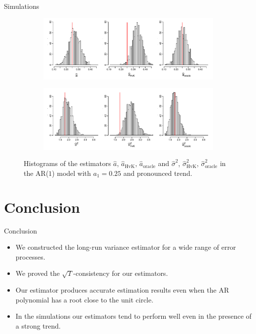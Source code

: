 \documentclass[10pt, handout]{beamer}
\begin{document}
\begin{frame}{Simulations}


\begin{figure}[t!]
\centering
\begin{subfigure}[b]{0.8\textwidth}
\includegraphics[width=\textwidth]{a_hat_histograms_a1=25_T=500_slope=10_(q,r,M1,M2)=(25,10,20,30).pdf}
\end{subfigure}
\begin{subfigure}[b]{0.8\textwidth}
\includegraphics[width=\textwidth]{lrv_histograms_a1=25_T=500_slope=10_(q,r,M1,M2)=(25,10,20,30).pdf}
\end{subfigure}
\caption{Histograms of the estimators $\widehat{a}$, $\widehat{a}_{\text{HvK}}$, $\widehat{a}_{\text{oracle}}$ and $\widehat{\sigma}^2$, $\widehat{\sigma}^2_{\text{HvK}}$, $\widehat{\sigma}^2_{\text{oracle}}$ in the AR($1$) model with $a_1 = 0.25$ and pronounced trend.}\label{fig:hist_scenario2} 
\end{figure}

\end{frame}


\section{Conclusion}
\begin{frame}{Conclusion}
\begin{itemize}
\item We constructed the long-run variance estimator for a wide range of error processes.
\item We proved the $\sqrt{T}$-consistency for our estimators.
\item Our estimator produces accurate estimation results even when the AR polynomial has a root close to the unit circle.
\item In the simulations our estimators tend to perform well even in the presence of a strong trend.
\end{itemize}
\end{frame}
\end{document}
